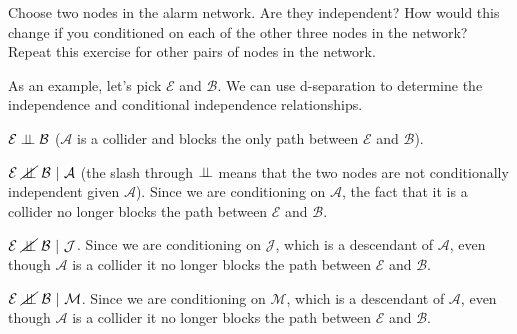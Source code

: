 \documentclass[review_Solutions]{subfiles}
\begin{document}
\begin{exercise}
Choose two nodes in the alarm network.  Are they independent?  How would this change if you conditioned on each of the other three nodes in the network?  Repeat this exercise for other pairs of nodes in the network.
\begin{boxedsolution}
As an example, let's pick $\mathcal{E}$ and $\mathcal{B}$.  We can use d-separation to determine the independence and conditional independence relationships.
\bi
\item $\mathcal{E} \perp\!\!\!\perp \mathcal{B}$ ($\mathcal{A}$ is a collider and blocks the only path between $\mathcal{E}$ and $\mathcal{B}$).
\item $\mathcal{E} ~\cancel{\perp\!\!\!\perp}~ \mathcal{B}~|~\mathcal{A}$ (the slash through $\perp\!\!\!\perp$ means that the two nodes are not conditionally independent given $\mathcal{A}$).  Since we are conditioning on $\mathcal{A}$, the fact that it is a collider no longer blocks the path between $\mathcal{E}$ and $\mathcal{B}$.
\item $\mathcal{E} ~\cancel{\perp\!\!\!\perp}~ \mathcal{B}~|~\mathcal{J}$.  Since we are conditioning on $\mathcal{J}$, which is a descendant of $\mathcal{A}$, even though $\mathcal{A}$ is a collider it no longer blocks the path between $\mathcal{E}$ and $\mathcal{B}$.
\item $\mathcal{E} ~\cancel{\perp\!\!\!\perp}~ \mathcal{B}~|~\mathcal{M}$.  Since we are conditioning on $\mathcal{M}$, which is a descendant of $\mathcal{A}$, even though $\mathcal{A}$ is a collider it no longer blocks the path between $\mathcal{E}$ and $\mathcal{B}$.
\ei
\end{boxedsolution}
\end{exercise}
\end{document}

